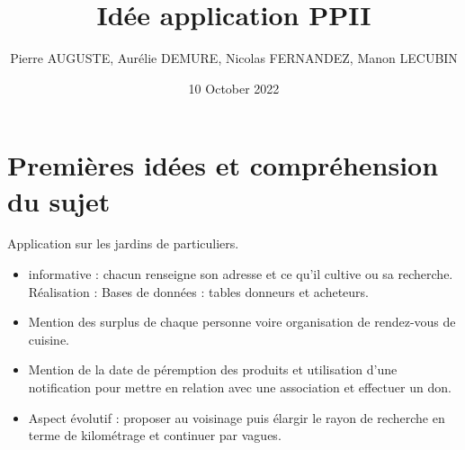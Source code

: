 \documentclass{article}
\title{Idée application PPII}
\author{Pierre AUGUSTE, Aurélie DEMURE, Nicolas FERNANDEZ, Manon LECUBIN}
\date{10 October 2022}
\begin{document}
\maketitle

\section{Premières idées et compréhension du sujet}
Application sur les jardins de particuliers.
\begin{itemize}
    \item informative : chacun renseigne son adresse et ce qu'il cultive 
    ou sa recherche. Réalisation : Bases de données : tables donneurs 
    et acheteurs.
    \item Mention des surplus de chaque personne voire organisation de
    rendez-vous de cuisine.
    \item Mention de la date de péremption des produits et utilisation
    d'une notification pour mettre en relation avec une association
    et effectuer un don.
    \item Aspect évolutif : proposer au voisinage puis élargir le rayon de 
    recherche en terme de kilométrage et continuer par vagues.
\end{itemize}
\end{document}
